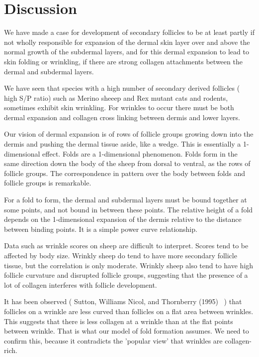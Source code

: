 \documentclass[titlepage]{article}  %
\begin{document}
\clearpage
\section{Discussion}
We have made a case for development of secondary follicles to be at least partly if not wholly responsible for expansion of the dermal skin layer over and above the normal growth of the subdermal layers, and for this dermal expansion to lead to skin folding or wrinkling, if there are strong collagen attachments between the dermal and subdermal layers.

We have seen that species with a high number of secondary derived follicles ( high S/P ratio) such as Merino sheeep and Rex mutant cats and rodents, sometimes exhibit skin wrinkling. For wrinkles to occur there must be both dermal expansion and collagen cross linking between dermis and lower layers.

 Our vision of dermal expansion is of rows of follicle groups growing down into the dermis and pushing the dermal tissue aside, like a wedge. This is essentially a 1-dimensional effect. Folds are a 1-dimensional phenomenon. Folds form in the same direction down the body of the sheep from dorsal to ventral, as the rows of follicle groups. The correspondence in pattern over the body between folds and follicle groups is remarkable.

For a fold to form, the dermal and subdermal layers must be bound together at some points, and not bound in between these points. The relative height of a fold depends on the 1-dimensional expansion of the dermis relative to the distance between binding points.  It is a simple power curve relationship.

Data such as wrinkle scores on sheep are difficult to interpret.  Scores tend to be affected by body size. Wrinkly sheep do tend to have more secondary follicle tissue, but the correlation is only moderate. Wrinkly sheep also tend to have high follicle curvature and disrupted follicle groups, suggesting that the presence of a lot of collagen interferes with follicle development.

 It has been observed ( Sutton, Williams Nicol, and Thornberry (1995)~\cite{sutt:95} )  that follicles on a wrinkle are less curved than follicles on a flat area between wrinkles. This suggests that there is less collagen at a wrinkle than at the flat points between wrinkle. That is what our model of fold formation assumes. We need to confirm this, because it contradicts the 'popular view' that wrinkles are collagen-rich. 
\end{document}
